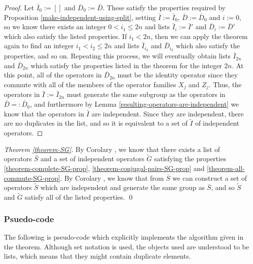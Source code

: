 \documentclass[twocolumn,showpacs,preprintnumbers,amsmath,amssymb,nofootinbib,pra,floatfix]{revtex4}
\begin{document}
\begin{proof}
Let $\bar I_0 := []$ and $\bar D_0 := \bar D$.  These satisfy the properties required by Proposition \ref{make-independent-using-split}, setting $\bar I:=\bar I_0$, $\bar D:=\bar D_0$ and $i:=0$, so we know there exists an integer $0<i_1\le 2n$ and lists $\bar I_i:=\bar I'$ and $\bar D_i:=\bar D'$ which also satisfy the listed properties.  If $i_1<2n$, then we can apply the theorem again to find an integer $i_1<i_2\le 2n$ and lists $\bar I_{i_2}$ and $\bar D_{i_2}$ which also satisfy the properties, and so on.  Repeating this process, we will eventually obtain lists $\bar I_{2n}$ and $\bar D_{2n}$ which satisfy the properties listed in the theorem for the integer $2n$.  At this point, all of the operators in $\bar D_{2n}$ must be the identity operator since they commute with all of the members of the operator families $X_j$ and $Z_j$.  Thus, the operators in $\bar I := \bar I_{2n}$ must generate the same subgroup as the operators in $\bar D =: \bar D_0$, and furthermore by Lemma \ref{resulting-operators-are-independent} we know that the operators in $\bar I$ are independent.  Since they are independent, there are no duplicates in the list, and so it is equivalent to a set of $\tilde I$ of independent operators.
\end{proof}
\begin{proof}[Theorem \ref{theorem-SG}]
By Corolary \label{corolary-SG}, we know that there exists a list of operators $\bar S$ and a set of independent operators $\tilde G$ satisfying the properties \ref{theorem-complete-SG-prop}, \ref{theorem-conjugal-pairs-SG-prop} and \ref{theorem-all-commute-SG-prop}.  By Corolary \label{corolary-make-independent-using-split}, we know that from $\bar S$ we can construct a set of operators $\tilde S$ which are independent and generate the same group as $\bar S$, and so $\tilde S$ and $\tilde G$ satisfy all of the listed properties. \qed
\end{proof}

\subsubsection{Psuedo-code}

The following is pseudo-code which explicitly implements the algorithm given in the theorem.  Although set notation is used, the objects used are understood to be lists, which means that they might contain duplicate elements.
\end{document}
